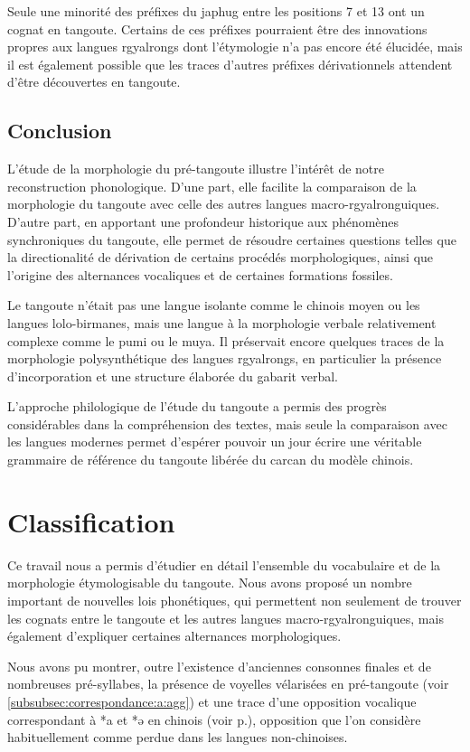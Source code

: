 \documentclass[oldfontcommands,twoside,a4paper,11pt,draft]{memoir}
\begin{document}
Seule une   minorité  des préfixes du japhug entre les positions 7 et 13 ont un cognat en tangoute. Certains de ces préfixes pourraient être des innovations propres aux langues rgyalrongs dont l'étymologie n'a pas encore été élucidée, mais il est également possible que les traces d'autres préfixes dérivationnels attendent d'être découvertes en tangoute.


\section{Conclusion}
 
L'étude de la morphologie du pré-tangoute illustre l'intérêt de notre reconstruction phonologique. D'une part, elle facilite la comparaison de la morphologie du tangoute avec celle des autres langues macro-rgyalronguiques. D'autre part,  en apportant une profondeur historique aux phénomènes synchroniques du tangoute, elle permet de résoudre certaines questions telles que la directionalité de dérivation de certains procédés morphologiques, ainsi que l'origine des alternances vocaliques et  de certaines formations fossiles. 

Le tangoute n'était pas une langue isolante comme le chinois moyen ou les langues  lolo-birmanes, mais une langue à la morphologie verbale relativement complexe comme le pumi ou le muya. Il préservait encore quelques traces de la morphologie polysynthétique des langues rgyalrongs, en particulier la présence d'incorporation et une structure élaborée du gabarit verbal.

L'approche philologique de l'étude du tangoute a permis des progrès considérables dans la compréhension des textes, mais seule la comparaison avec les langues modernes permet d'espérer pouvoir un jour écrire une véritable grammaire de référence du tangoute libérée du carcan du modèle chinois.

\chapter{Classification} \label{chap:classification}
\thispagestyle{empty}
Ce travail nous a permis d'étudier en détail l'ensemble du vocabulaire et de la morphologie étymologisable du tangoute. Nous avons proposé un nombre important de nouvelles lois phonétiques, qui permettent non seulement de trouver les cognats entre le tangoute et les autres langues macro-rgyalronguiques, mais également d'expliquer certaines alternances morphologiques.

Nous avons pu montrer, outre l'existence d'anciennes consonnes finales et de nombreuses pré-syllabes, la présence de voyelles vélarisées en pré-tangoute (voir \ref{subsubsec:correspondance:a:agg}) et une trace d'une opposition vocalique correspondant à  *a et *ə en chinois (voir p.\pageref{rimes:01:3:ju/a}), opposition que l'on considère habituellement comme perdue dans les langues non-chinoises.
\end{document}
